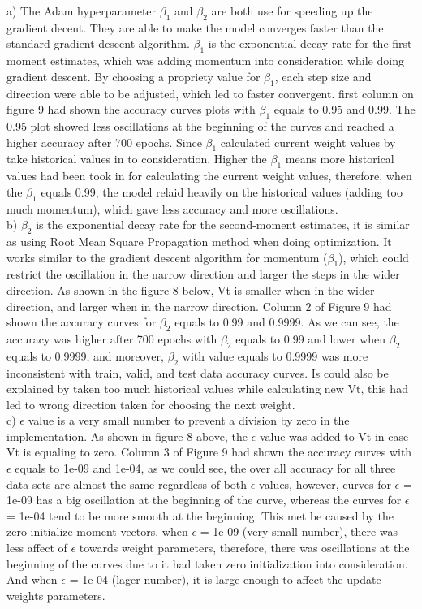 \documentclass[10pt,letterpaper]{article}
\begin{document}
a) The Adam hyperparameter $\beta_1$ and $\beta_2$ are both use for speeding up the gradient decent. They are able to make the model converges faster than the standard gradient descent algorithm. $\beta_1$ is the exponential decay rate for the first moment estimates, which was adding momentum into consideration while doing gradient descent. By choosing a propriety value for $\beta_1$, each step size and direction were able to be adjusted, which led to faster convergent. first column on figure 9 had shown the accuracy curves plots with $\beta_1$ equals to 0.95 and 0.99. The 0.95 plot showed less oscillations at the beginning of the curves and reached a higher accuracy after 700 epochs. Since $\beta_1$ calculated current weight values by take historical values in to consideration. Higher the $\beta_1$ means more historical values had been took in for calculating the current weight values, therefore, when the $\beta_1$ equals 0.99, the model relaid heavily on the historical values (adding too much momentum), which gave less accuracy and more oscillations.\\

b) $\beta_2$ is the exponential decay rate for the second-moment estimates, it is similar as using Root Mean Square Propagation method when doing optimization. It works similar to the gradient descent algorithm for momentum ($\beta_1$), which could restrict the oscillation in the narrow direction and larger the steps in the wider direction. As shown in the figure 8 below, Vt is smaller when in the wider direction, and larger when in the narrow direction. Column 2 of Figure 9 had shown the accuracy curves for $\beta_2$ equals to 0.99 and 0.9999. As we can see, the accuracy was higher after 700 epochs with $\beta_2$ equals to 0.99 and lower when $\beta_2$ equals to 0.9999, and moreover, $\beta_2$ with value equals to 0.9999 was more inconsistent with train, valid, and test data accuracy curves. Is could also be explained by taken too much historical values while calculating new Vt, this had led to wrong direction taken for choosing the next weight.\\ 

c) $\epsilon$ value is a very small number to prevent a division by zero in the implementation. As shown in figure 8 above, the $\epsilon$ value was added to Vt in case Vt is equaling to zero. Column 3 of Figure 9 had shown the accuracy curves with $\epsilon$ equals to 1e-09 and 1e-04, as we could see, the over all accuracy for all three data sets are almost the same regardless of both $\epsilon$ values, however, curves for $\epsilon$ = 1e-09 has a big oscillation at the beginning of the curve, whereas the curves for $\epsilon$ = 1e-04 tend to be more smooth at the beginning. This met be caused by the zero initialize moment vectors, when $\epsilon$ = 1e-09 (very small number), there was less affect of $\epsilon$ towards weight parameters, therefore, there was oscillations at the beginning of the curves due to it had taken zero initialization into consideration. And when $\epsilon$ = 1e-04 (lager number), it is large enough to affect the update weights parameters.\\
\end{document}
